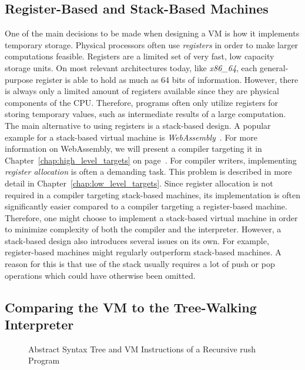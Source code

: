 \subsection{Register-Based and Stack-Based Machines}

One of the main decisions to be made when designing a VM is how it implements temporary storage.
Physical processors often use \emph{registers} in order to make larger computations feasible.
Registers are a limited set of very fast, low capacity storage units.
On most relevant architectures today, like \emph{x86\_64}, each general-purpose register is able to hold as much as 64 bits of information.
However, there is always only a limited amount of registers available since they are physical components of the CPU\@.
Therefore, programs often only utilize registers for storing temporary values, such as intermediate results of a large computation.
The main alternative to using registers is a stack-based design.
A popular example for a stack-based virtual machine is \emph{WebAssembly}~\cite[p.~44]{Sendil2022-fy}.
For more information on WebAssembly, we will present a compiler targeting it in Chapter~\ref{chap:high_level_targets} on page~\pageref{sec:wasm}.
For compiler writers, implementing \emph{register allocation} is often a demanding task.
This problem is described in more detail in Chapter~\ref{chap:low_level_targets}.
Since register allocation is not required in a compiler targeting stack-based machines, its implementation is often significantly easier compared to a compiler targeting a register-based machine.
Therefore, one might choose to implement a stack-based virtual machine in order to minimize complexity of both the compiler and the interpreter.
However, a stack-based design also introduces several issues on its own.
For example, register-based machines might regularly outperform stack-based machines.
A reason for this is that use of the stack usually requires a lot of push or pop operations which could have otherwise been omitted.

\subsection{Comparing the VM to the Tree-Walking Interpreter}

\begin{wrapfigure}{R}{.53\textwidth}
    \center
	\caption{Abstract Syntax Tree and VM Instructions of a Recursive rush Program}\label{fig:tree_vs_vm_tree}
\end{wrapfigure}

